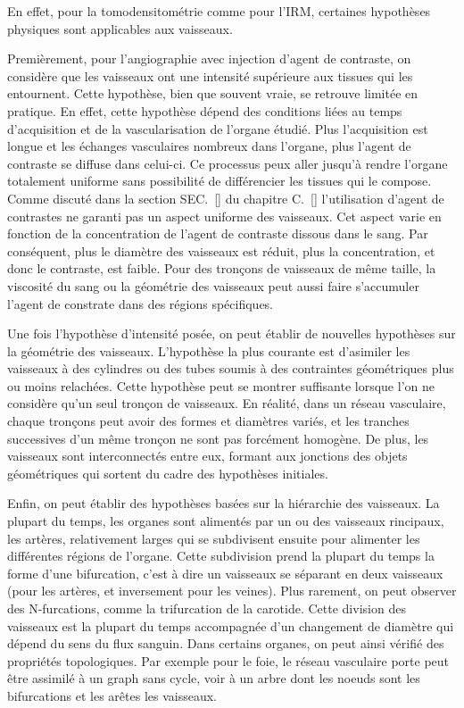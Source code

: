 En effet, pour la tomodensitométrie comme pour l'IRM, certaines hypothèses physiques sont applicables aux vaisseaux.

Premièrement, pour l'angiographie avec injection d'agent de contraste, on considère que les vaisseaux ont une intensité supérieure aux tissues qui les entournent. Cette hypothèse, bien que souvent vraie, se retrouve limitée en pratique. En effet, cette hypothèse dépend des conditions liées au temps d'acquisition et de la vascularisation de l'organe étudié. Plus l'acquisition est longue et les échanges vasculaires nombreux dans l'organe, plus l'agent de contraste se diffuse dans celui-ci. Ce processus peux aller jusqu'à rendre l'organe totalement uniforme sans possibilité de différencier les tissues qui le compose. Comme discuté dans la section SEC.~\ref{} du chapitre C.~\ref{} l'utilisation d'agent de contrastes ne garanti pas un aspect uniforme des vaisseaux. Cet aspect varie en fonction de la concentration de l'agent de contraste dissous dans le sang. Par conséquent, plus le diamètre des vaisseaux est réduit, plus la concentration, et donc le contraste, est faible. Pour des tronçons de vaisseaux de même taille, la viscosité du sang ou la géométrie des vaisseaux peut aussi faire s'accumuler l'agent de constrate dans des régions spécifiques.

Une fois l'hypothèse d'intensité posée, on peut établir de nouvelles hypothèses sur la géométrie des vaisseaux. L'hypothèse la plus courante est d'asimiler les vaisseaux à des cylindres ou des tubes soumis à des contraintes géométriques plus ou moins relachées. Cette hypothèse peut se montrer suffisante lorsque l'on ne considère qu'un seul tronçon de vaisseaux. En réalité, dans un réseau vasculaire, chaque tronçons peut avoir des formes et diamètres variés, et les tranches successives d'un même tronçon ne sont pas forcément homogène. De plus, les vaisseaux sont interconnectés entre eux, formant aux jonctions des objets géométriques qui sortent du cadre des hypothèses initiales.

Enfin, on peut établir des hypothèses basées sur la hiérarchie des vaisseaux. La plupart du temps, les organes sont alimentés par un ou des vaisseaux rincipaux, les artères, relativement larges qui se subdivisent ensuite pour alimenter les différentes régions de l'organe. Cette subdivision prend la plupart du temps la forme d'une bifurcation, c'est à dire un vaisseaux se séparant en deux vaisseaux (pour les artères, et inversement pour les veines). Plus rarement, on peut observer des N-furcations, comme la trifurcation de la carotide. Cette division des vaisseaux est la plupart du temps accompagnée d'un changement de diamètre qui dépend du sens du flux sanguin. Dans certains organes, on peut ainsi vérifié des propriétés topologiques. Par exemple pour le foie, le réseau vasculaire porte peut être assimilé à un graph sans cycle, voir à un arbre dont les noeuds sont les bifurcations et les arêtes les vaisseaux.

